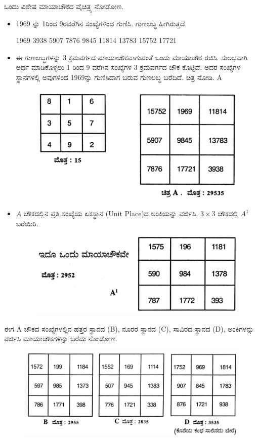ಒಂದು ವಿಶೇಷ ಮಾಯಾಚೌಕದ ವೈಚಿತ್ರ್ಯ ನೋಡೋಣ.

\begin{itemize}
	\item 1969 ನ್ನು 1ರಿಂದ 9ರವರೆಗಿನ ಸಂಖ್ಯೆಗಳಿಂದ ಗುಣಿಸಿ. ಗುಣಲಬ್ಧ ಹೀಗಿರುತ್ತದೆ.

	1969 3938 5907 7876 9845 11814 13783 15752 17721
	\item ಈ ಗುಣಲಬ್ಧಗಳನ್ನು 3 ಕ್ರಮವರ್ಗದ ಮಾಯಾಚೌಕವಾಗುವಂತೆ ಒಂದು ಮಾಯಾಚೌಕ ರಚಿಸಿ. ಸುಲಭವಾಗಿ ಅರ್ಥ ಮಾಡಿಕೊಳ್ಳಲು 1 ರಿಂದ 9 ವರೆಗಿನ ಸಂಖ್ಯೆಗಳ 3 ಕ್ರಮವರ್ಗದ ಚೌಕ ಕೊಟ್ಟಿದೆ. ಅದರ ಸಂಖ್ಯೆಗಳ ಸ್ಥಾನಗಳಲ್ಲಿ ಅವುಗಳಿಂದ 1969ನ್ನು ಗುಣಿಸಿದಾಗ ಬರುವ ಗುಣಲಬ್ಧ ಬರೆದಿದೆ. ಚಿತ್ರ ನೋಡಿ. A
	\begin{figure}[H]
	\includegraphics[scale=.9]{src/figures/chap7/fig7-8.jpg}
	\end{figure}

	\item $A$ ಚೌಕದಲ್ಲಿನ ಪ್ರತಿ ಸಂಖ್ಯೆಯ ಏಕಸ್ಥಾನ (Unit Place)ದ ಅಂಕಿಯನ್ನು ವರ್ಜಿಸಿ, $3 \times 3$ ಚೌಕದಲ್ಲಿ $A^1$ ಬರೆಯಿರಿ.
	\begin{figure}[H]
	\includegraphics[scale=.9]{src/figures/chap7/fig7-9.jpg}
	\end{figure}
\end{itemize}

ಈಗ A ಚೌಕದ ಸಂಖ್ಯೆಗಳಲ್ಲಿನ ಹತ್ತರ ಸ್ಥಾನದ (B), ನೂರರ ಸ್ಥಾನದ (C), ಸಾವಿರದ ಸ್ಥಾನದ (D), ಅಂಕಿಗಳನ್ನು ವರ್ಜಿಸಿ ಮಾಯಾಚೌಕಗಳನ್ನು ಬರೆದು ನೋಡೋಣ.
\begin{figure}[H]
\includegraphics[scale=.8]{src/figures/chap7/fig7-10.jpg}
\end{figure}


